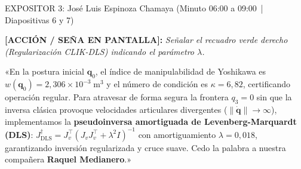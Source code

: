 \documentclass[11pt,a4paper]{article}
\newcommand{\accion}[1]{%
  \par\smallskip\noindent%
  {\color{uniGranate}\textbf{[ACCIÓN / SEÑA EN PANTALLA]:}} {\itshape\color{uniAzul!90!black} #1}\par\smallskip%
}
\newcommand{\speech}[1]{%
  \noindent{\color{verdeOk!85!black}\textbf{[SPEECH]:}} «#1»\par\medskip%
}
\begin{document}
\begin{cajaexpositor}[uniAzulC]{EXPOSITOR 3: José Luis Espinoza Chamaya (Minuto 06:00 a 09:00 \,|\, Diapositivas 6 y 7)}
\accion{Señalar el recuadro verde derecho (\emph{Regularización CLIK-DLS}) indicando el parámetro $\lambda$.}
\speech{En la postura inicial $\bm{q}_0$, el índice de manipulabilidad de Yoshikawa es $w(\bm{q}_0) = 2{,}306\times 10^{-3}\;\text{m}^3$ y el número de condición es $\kappa = 6{,}82$, certificando operación regular. Para atravesar de forma segura la frontera $q_3 = 0$ sin que la inversa clásica provoque velocidades articulares divergentes ($\lVert\dot{\bm{q}}\rVert \to \infty$), implementamos la \textbf{pseudoinversa amortiguada de Levenberg-Marquardt (DLS)}: $J^\dagger_{\text{DLS}} = J_v^\top (J_v J_v^\top + \lambda^2 I)^{-1}$ con amortiguamiento $\lambda = 0{,}018$, garantizando inversión regularizada y cruce suave. Cedo la palabra a nuestra compañera \textbf{Raquel Medianero}.}
\end{cajaexpositor}
\end{document}
